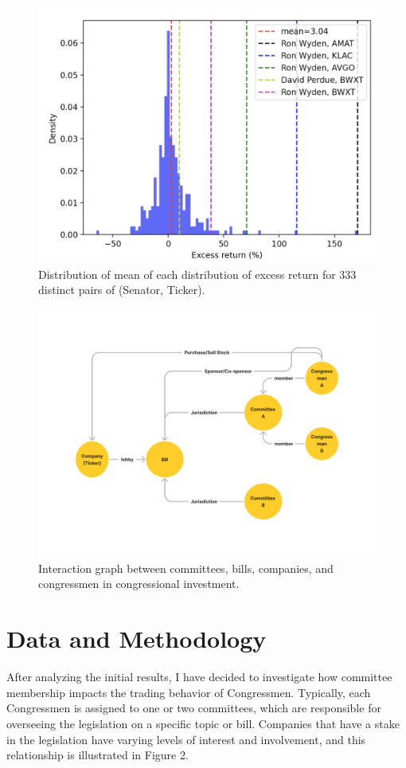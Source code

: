 \documentclass[15pt,letterpaper]{article}
\begin{document}
\begin{figure}[h]
  \centering
  \includegraphics[width=1\textwidth]{imgs/ex-r/aggregate.png}
  \caption{Distribution of mean of each distribution of excess return for $333$ distinct pairs of (Senator, Ticker).}
  \label{fig:agg-ex-r}
\end{figure}

\begin{figure}[h]
  \centering
  \includegraphics[width=1\textwidth]{imgs/cgd.png}
  \caption{Interaction graph between committees, bills, companies, and congressmen in congressional investment.}
  \label{fig:cbd}
\end{figure}


\section{Data and Methodology}
After analyzing the initial results, I have decided to investigate how committee membership impacts the trading behavior of Congressmen. Typically, each Congressmen is assigned to one or two committees, which are responsible for overseeing the legislation on a specific topic or bill. Companies that have a stake in the legislation have varying levels of interest and involvement, and this relationship is illustrated in Figure 2.
\end{document}
